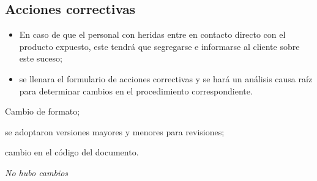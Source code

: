 \subsection{Acciones correctivas}
\begin{itemize}
	\item En caso de que el personal con heridas entre en contacto directo con el producto expuesto, este tendrá que segregarse e informarse al cliente sobre este suceso;
	\item se llenara el formulario de acciones correctivas y se hará un análisis causa raíz para determinar cambios en el procedimiento correspondiente.
\end{itemize}

\begin{changelog}[simple, sectioncmd=\subsection*,label=changelog-1.7]
	\begin{version}[v=2.1, date=2023--01, author=Pablo E. Alanis]
			\item Cambio de formato;
			\item se adoptaron versiones mayores y menores para revisiones;
			\item cambio en el código del documento.
	\end{version}

	\begin{version}[v=1.8, date=2022-05, author=Alonso M.]
		\item \textit{No hubo cambios}
	\end{version}
\end{changelog}

\pagestyle{formato}